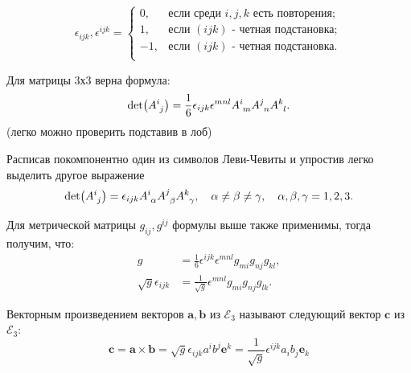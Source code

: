 
\begin{definition}
	\begin{equation*}
		\epsilon_{ijk},\epsilon^{ijk} = \begin{cases}
			0, &\text{если среди $i,j,k$ есть повторения};\\
			1, &\text{если $(ijk)$ - четная подстановка};\\
			-1,&\text{если $(ijk)$ - четная подстановка}.\\
		\end{cases}
	\end{equation*}
\end{definition}

\begin{definition}[Определитель]
	Для матрицы 3х3 верна формула:
	\begin{equation*}
		\det(\tensor{A}{^i_j}) = \frac{1}{6}\epsilon_{ijk}\epsilon^{mnl}\tensor{A}{^i_m}\tensor{A}{^j_n}\tensor{A}{^k_l}.
	\end{equation*}
	(легко можно проверить подставив в лоб)
	
	Расписав покомпонентно один из символов Леви-Чевиты и упростив легко выделить другое выражение
	\begin{equation*}
		\det(\tensor{A}{^i_j}) = \epsilon_{ijk}\tensor{A}{^i_\alpha}\tensor{A}{^j_\beta}\tensor{A}{^k_\gamma},\quad \alpha\neq\beta\neq\gamma,\quad\alpha,\beta,\gamma=1,2,3.
	\end{equation*}
\end{definition}

Для метрической матрицы $g_{ij}, g^{ij}$ формулы выше также применимы, тогда получим, что:
\begin{align*}
	g &= \frac{1}{6}\epsilon^{ijk}\epsilon^{mnl}g_{mi}g_{nj}g_{kl},\\
	\sqrt{g}\epsilon_{ijk}&=\frac{1}{\sqrt{g}}\epsilon^{mnl}g_{mi}g_{nj}g_{lk}.
\end{align*}

\begin{definition}
	Векторным произведением векторов $\mathbf{a}, \mathbf{b}$ из $\mathcal{E}_3$ называют следующий вектор $\mathbf{c}$ из $\mathcal{E}_3$:
	\begin{equation*}
		\mathbf{c} = \mathbf{a} \times \mathbf{b} = \sqrt{g} \epsilon_{ijk} a^ib^j\mathbf{e}^k = \frac{1}{\sqrt{g}}\epsilon^{ijk} a_ib_j\mathbf{e}_k
	\end{equation*}
\end{definition}

